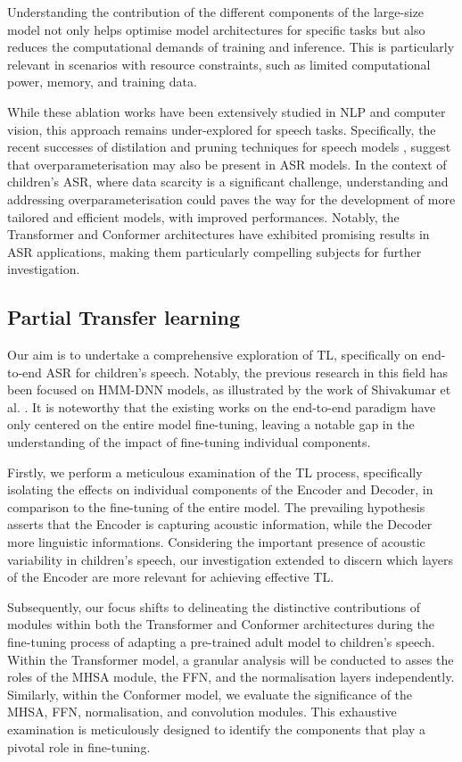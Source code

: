 Understanding the contribution of the different components of the large-size model not only helps optimise model architectures for specific tasks but also reduces the computational demands of training and inference. This is particularly relevant in scenarios with resource constraints, such as limited computational power, memory, and training data. 


While these ablation works have been extensively studied in NLP and computer vision, this approach remains under-explored for speech tasks. Specifically, the recent successes of distilation and pruning techniques for speech models \cite{gandhi2023distilwhisper,chang2022distilhubert,peng23c_interspeech}, suggest that overparameterisation may also be present in ASR models. In the context of children's ASR, where data scarcity is a significant challenge, understanding and addressing overparameterisation could paves the way for the development of more tailored and efficient models, with improved performances. Notably, the Transformer and Conformer architectures have exhibited promising results in ASR applications, making them particularly compelling subjects for further investigation.


\subsection{Partial Transfer learning}
Our aim is to undertake a comprehensive exploration of TL, specifically on end-to-end ASR for children's speech. Notably, the previous research in this field has been focused on HMM-DNN models, as illustrated by the work of Shivakumar et al. \cite{shivakumar2020transfer}. It is noteworthy that the existing works on the end-to-end paradigm have only centered on the entire model fine-tuning, leaving a notable gap in the understanding of the impact of fine-tuning individual components.

Firstly, we perform a meticulous examination of the TL process, specifically isolating the effects on individual components of the Encoder and Decoder, in comparison to the fine-tuning of the entire model. The prevailing hypothesis asserts that the Encoder is  capturing acoustic information, while the Decoder more linguistic informations. Considering the important presence of acoustic variability in children's speech, our investigation extended to discern which layers of the Encoder are more relevant for achieving effective TL.

Subsequently, our focus shifts to delineating the distinctive contributions of modules within both the Transformer and Conformer architectures during the fine-tuning process of adapting a pre-trained adult model to children's speech. Within the Transformer model, a granular analysis will be conducted to asses the roles of the MHSA module, the FFN, and the normalisation layers independently. Similarly, within the Conformer model, we evaluate the significance of the MHSA, FFN, normalisation, and convolution modules. This exhaustive examination is meticulously designed to identify the components that play a pivotal role in fine-tuning.


